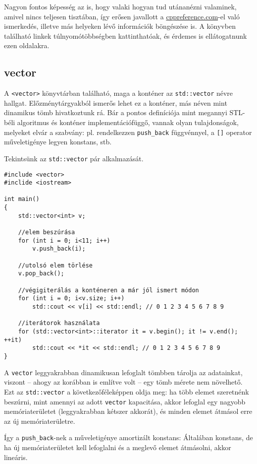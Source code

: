 \documentclass[a4paper,11.5pt,table]{article}
\begin{document}
	\begin{note}
		Nagyon fontos képesség az is, hogy valaki hogyan tud utánanézni valaminek, amivel nincs teljesen tisztában, így erősen javallott a \url{cppreference.com}-el való ismerkedés, illetve más helyeken lévő információk böngészése is. A könyvben található linkek túlnyomótöbbségben kattinthatóak, és érdemes is ellátogatnunk ezen oldalakra.
	\end{note}	
	\subsection{vector}
	A \texttt{<vector>} könyvtárban található, maga a konténer az \texttt{std::vector} névre hallgat. Előzménytárgyakból ismerős lehet ez a konténer, más néven mint dinamikus tömb hivatkoztunk rá. Bár a pontos definíciója mint megannyi STL-béli algoritmus és konténer implementációfüggő, vannak olyan tulajdonságok, melyeket elvár a szabvány: pl. rendelkezzen \texttt{push\_back} függvénnyel, a \texttt{[]} operator műveletigénye legyen konstans, stb.
	
	\medskip
	Tekintsünk az \texttt{std::vector} pár alkalmazását.
	\begin{lstlisting}
#include <vector>
#inclide <iostream>

int main()
{
	std::vector<int> v;
	
	//elem beszúrása
	for (int i = 0; i<11; i++)
		v.push_back(i);
		
	//utolsó elem törlése
	v.pop_back();
	
	//végigiterálás a konténeren a már jól ismert módon
	for (int i = 0; i<v.size; i++)
		std::cout << v[i] << std::endl; // 0 1 2 3 4 5 6 7 8 9
		
	//iterátorok használata
	for (std::vector<int>::iterator it = v.begin(); it != v.end(); ++it)
		std::cout << *it << std::endl; // 0 1 2 3 4 5 6 7 8 9
}
	\end{lstlisting}
	A \texttt{vector} leggyakrabban dinamikusan lefoglalt tömbben tárolja az adatainkat, viszont -- ahogy az korábban is említve volt -- egy tömb mérete nem növelhető. Ezt az \texttt{std::vector} a következőféleképpen oldja meg: ha több elemet szeretnénk beszúrni, mint amennyi az adott \texttt{vector} kapacitása, akkor lefoglal egy nagyobb memóriaterületet (leggyakrabban kétszer akkorát), és minden elemet átmásol erre az új memóriaterületre. 
	
	Így a \texttt{push\_back}-nek a műveletigénye amortizált konstans: Általában konstans, de ha új memóriaterületet kell lefoglalni és a meglevő elemet átmásolni, akkor lineáris.
	
\end{document}

